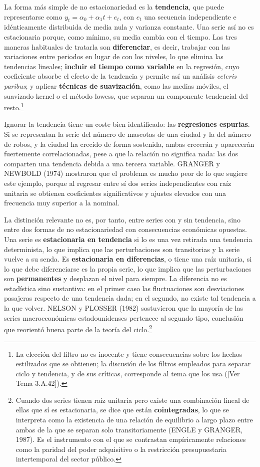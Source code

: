 \documentclass[10pt,a4paper]{article}
\newcommand{\authorfont}[1]{{\fontfamily{EBGaramond-TLF}\selectfont #1}}
\begin{document}
La forma más simple de no estacionariedad es la \textbf{tendencia}, que puede representarse como $y_t=\alpha_0+\alpha_1 t+e_t$, con $e_t$ una secuencia independiente e idénticamente distribuida de media nula y varianza constante. Una serie así no es estacionaria porque, como mínimo, su media cambia con el tiempo. Las tres maneras habituales de tratarla son \textbf{diferenciar}, es decir, trabajar con las variaciones entre periodos en lugar de con los niveles, lo que elimina las tendencias lineales; \textbf{incluir el tiempo como variable} en la regresión, cuyo coeficiente absorbe el efecto de la tendencia y permite así un análisis \textit{ceteris paribus}; y aplicar \textbf{técnicas de suavización}, como las medias móviles, el suavizado kernel o el método lowess, que separan un componente tendencial del resto.\footnote{%
    La elección del filtro no es inocente y tiene consecuencias sobre los hechos estilizados que se obtienen; la discusión de los filtros empleados para separar ciclo y tendencia, y de sus críticas, corresponde al tema que los usa ([\authorfont{Ver Tema 3.A.42}]).
}

Ignorar la tendencia tiene un coste bien identificado: las \textbf{regresiones espurias}. Si se representan la serie del número de mascotas de una ciudad y la del número de robos, y la ciudad ha crecido de forma sostenida, ambas crecerán y aparecerán fuertemente correlacionadas, pese a que la relación no significa nada: las dos comparten una tendencia debida a una tercera variable. GRANGER y NEWBOLD (1974) mostraron que el problema es mucho peor de lo que sugiere este ejemplo, porque al regresar entre sí dos series independientes con raíz unitaria se obtienen coeficientes significativos y ajustes elevados con una frecuencia muy superior a la nominal.

La distinción relevante no es, por tanto, entre series con y sin tendencia, sino entre dos formas de no estacionariedad con consecuencias económicas opuestas. Una serie es \textbf{estacionaria en tendencia} si lo es una vez retirada una tendencia determinista, lo que implica que las perturbaciones son transitorias y la serie vuelve a su senda. Es \textbf{estacionaria en diferencias}, o tiene una raíz unitaria, si lo que debe diferenciarse es la propia serie, lo que implica que las perturbaciones son \textbf{permanentes} y desplazan el nivel para siempre. La diferencia no es estadística sino sustantiva: en el primer caso las fluctuaciones son desviaciones pasajeras respecto de una tendencia dada; en el segundo, no existe tal tendencia a la que volver. NELSON y PLOSSER (1982) sostuvieron que la mayoría de las series macroeconómicas estadounidenses pertenece al segundo tipo, conclusión que reorientó buena parte de la teoría del ciclo.\footnote{%
    Cuando dos series tienen raíz unitaria pero existe una combinación lineal de ellas que sí es estacionaria, se dice que están \textbf{cointegradas}, lo que se interpreta como la existencia de una relación de equilibrio a largo plazo entre ambas de la que se separan solo transitoriamente (ENGLE y GRANGER, 1987). Es el instrumento con el que se contrastan empíricamente relaciones como la paridad del poder adquisitivo o la restricción presupuestaria intertemporal del sector público.
}
\end{document}
